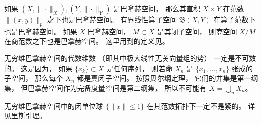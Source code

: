 如果 $(X,\|\cdot\|_X),(Y,\|\cdot\|_Y)$ 是巴拿赫空间， 那么其直积 $X\times Y$ 在范数 $\|(x,y)\|_{p}$ 之下也是巴拿赫空间。 有界线性算子空间 $\mathfrak{B}(X,Y)$ 在算子范数下也是巴拿赫空间。 如果 $X$ 巴拿赫空间， $M\subset X$ 是其闭子空间， 则商空间 $X/M$ 在商范数之下也是巴拿赫空间。 这里用到的定义见。

无穷维巴拿赫空间的代数维数 （即其中极大线性无关向量组的势） 一定是不可数的。 这是因为， 如果 $\{x_k\}\subset X$ 是任何序列， 则若命 $X_n$ 是 $\{x_1,...,x_n\}$ 张成的子空间， 那么每个 $X_n$ 都是真闭子空间。 按照贝尔纲定理， 它们的并集是第一纲集， 但巴拿赫空间作为完备度量空间是第二纲集， 所以不可能有 $X=\bigcup_n X_n$。

无穷维巴拿赫空间中的闭单位球 $\{\|x\|\leq1\}$ 在其范数拓扑下一定不是紧的。 详见里斯引理。
